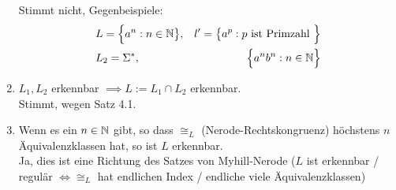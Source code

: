 \documentclass[12pt,a4paper]{article}
\begin{document}
\begin{enumerate}[label=\alph*)]
	Stimmt nicht, Gegenbeispiele:
	\begin{align*}
		&L=\Big\lbrace a^n:n\in\mathbb{N}\big\rbrace,& l'=\big\lbrace a^p:p\text{ ist Primzahl }\Big\rbrace\\
		&L_2=\Sigma^\ast, &\Big\lbrace a^n b^n:n\in\mathbb{N}\Big\rbrace
	\end{align*}
	\item $L_1,L_2$ erkennbar $\implies L:=L_1\cap L_2$ erkennbar.\\
	Stimmt, wegen Satz 4.1.
	\item Wenn es ein $n\in\mathbb{N}$ gibt, so dass $\cong_L$ (Nerode-Rechtskongruenz) höchstens $n$ Äquivalenzklassen hat, so ist $L$ erkennbar.\\
	Ja, dies ist eine Richtung des Satzes von Myhill-Nerode
	($L$ ist erkennbar / regulär $\Longleftrightarrow\cong_L$ hat endlichen Index / endliche viele Äquivalenzklassen)
\end{enumerate}
\end{document}
